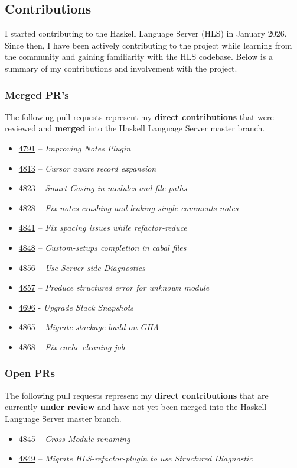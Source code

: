 \documentclass[a4paper,12pt]{article}
\newcommand{\pull}[1]{\href{https://github.com/haskell/haskell-language-server/pull/#1}{#1}}
\begin{document}
\subsection*{Contributions}
I started contributing to the Haskell Language Server (HLS) in January 2026. Since then, I have been actively contributing to the project while learning from the community and gaining familiarity with the HLS codebase. Below is a summary of my contributions and involvement with the project.


\subsubsection*{Merged PR's}
The following pull requests represent my \textbf{direct contributions} that were reviewed and \textbf{merged} into the Haskell Language Server master branch.
\vspace{0.3em}
\begin{itemize}
   \item\pull{4791} -- \textit{Improving Notes Plugin}
   \item \pull{4813} -- \textit{Cursor aware record expansion}
  \item \pull{4823} -- \textit{Smart Casing in modules and file paths}
  \item \pull{4828} -- \textit{Fix notes crashing and leaking single comments notes}
  \item \pull{4841} -- \textit{Fix spacing issues while refactor-reduce}
  \item \pull{4848} -- \textit{Custom-setups completion in cabal files}
  \item \pull{4856} -- \textit{Use Server side Diagnostics}
  \item \pull{4857} -- \textit{Produce structured error for unknown module }
  \item \pull{4696} - \textit{Upgrade Stack Snapshots}
  \item \pull{4865} -- \textit{Migrate stackage build on GHA}
  \item \pull{4868} -- \textit{Fix cache cleaning job}
\end{itemize}

\subsubsection*{Open PRs}
The following pull requests represent my \textbf{direct contributions} that are currently \textbf{under review} and have not yet been merged into the Haskell Language Server master branch.
\vspace{0.3em}
\begin{itemize}
  \item \pull{4845} -- \textit{Cross Module renaming}
  \item \pull{4849} -- \textit{Migrate HLS-refactor-plugin to use Structured Diagnostic}
\end{itemize}
\end{document}
